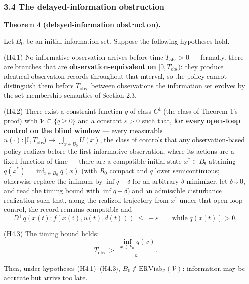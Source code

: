 \documentclass[11pt]{article}
\begin{document}
\subsubsection{3.4 The delayed-information
obstruction}\label{the-delayed-information-obstruction}

\textbf{Theorem 4 (delayed-information obstruction).}

Let \(B_0\) be an initial information set. Suppose the following
hypotheses hold.

(H4.1) No informative observation arrives before time
\(T_{\mathrm{obs}} > 0\) --- formally, there are branches that are
\textbf{observation-equivalent on \([0, T_{\mathrm{obs}})\)}: they
produce identical observation records throughout that interval, so the
policy cannot distinguish them before \(T_{\mathrm{obs}}\); between
observations the information set evolves by the set-membership semantics
of Section 2.3.

(H4.2) There exist a constraint function \(q\) of class \(C^1\) (the
class of Theorem 1's proof) with \(\mathcal{V} \subseteq \{ q \ge 0 \}\)
and a constant \(\varepsilon > 0\) such that, \textbf{for every
open-loop control on the blind window} --- every measurable
\(u(\cdot) : [0, T_{\mathrm{obs}}) \to \bigcup_{x \in B_0} U(x)\), the
class of controls that any observation-based policy realizes before the
first informative observation, where its actions are a fixed function of
time --- there are a compatible initial state \(x^* \in B_0\) attaining
\(q(x^*) = \inf_{x \in B_0} q(x)\) (with \(B_0\) compact and \(q\) lower
semicontinuous; otherwise replace the infimum by \(\inf q + \delta\) for
an arbitrary \(\delta\)-minimizer, let \(\delta \downarrow 0\), and read
the timing bound with \(\inf q + \delta\)) and an admissible disturbance
realization such that, along the realized trajectory from \(x^*\) under
that open-loop control, the record remains compatible and
\[D^+ q(x(t); f(x(t), u(t), d(t))) \;\le\; -\varepsilon \qquad \text{while } q(x(t)) > 0, \tag{3}\]

(H4.3) The timing bound holds:
\[T_{\mathrm{obs}} \;>\; \frac{\inf_{x \in B_0} q(x)}{\varepsilon}. \tag{4}\]

Then, under hypotheses (H4.1)--(H4.3),
\(B_0 \notin \mathrm{ERViab}_{\mathcal{I}}(\mathcal{V})\): information
may be accurate but arrive too late.
\end{document}
